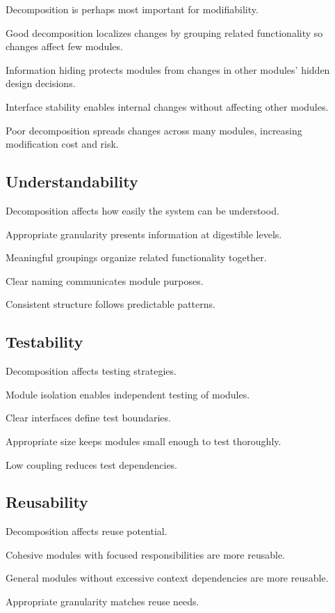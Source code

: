 \documentclass[11pt]{article}
\begin{document}
Decomposition is perhaps most important for modifiability.

Good decomposition localizes changes by grouping related functionality so changes affect few modules.

Information hiding protects modules from changes in other modules' hidden design decisions.

Interface stability enables internal changes without affecting other modules.

Poor decomposition spreads changes across many modules, increasing modification cost and risk.

\subsection{Understandability}

Decomposition affects how easily the system can be understood.

Appropriate granularity presents information at digestible levels.

Meaningful groupings organize related functionality together.

Clear naming communicates module purposes.

Consistent structure follows predictable patterns.

\subsection{Testability}

Decomposition affects testing strategies.

Module isolation enables independent testing of modules.

Clear interfaces define test boundaries.

Appropriate size keeps modules small enough to test thoroughly.

Low coupling reduces test dependencies.

\subsection{Reusability}

Decomposition affects reuse potential.

Cohesive modules with focused responsibilities are more reusable.

General modules without excessive context dependencies are more reusable.

Appropriate granularity matches reuse needs.
\end{document}
